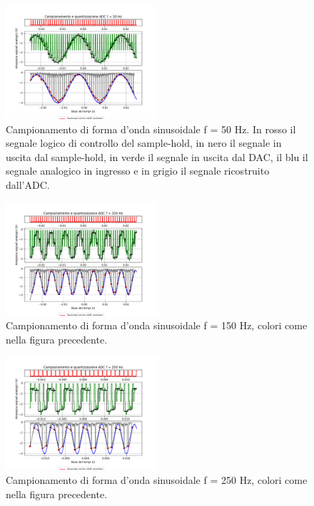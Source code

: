 \documentclass[journal]{IEEEtran}
\begin{document}
\clearpage
\clearpage
\begin{figure}[H]%
\begin{center}
\includegraphics[trim={0 25 0 0}, clip, width=0.50\textwidth]{analysis/output/campionamento_50Hz.pdf}

\caption{Campionamento di forma d'onda sinusoidale f = 50 Hz. In rosso il segnale logico di controllo del sample-hold, in nero il segnale in uscita dal sample-hold, in verde il segnale in uscita dal DAC, il blu il segnale analogico in ingresso e in grigio il segnale ricostruito dall'ADC.}
\label{fig:sampSH1}
\end{center}
\end{figure}
\vspace{-10mm}
%
\begin{figure}[H]%
\begin{center}
\includegraphics[trim={0 25 0 0}, clip,width=0.50\textwidth]{analysis/output/campionamento_150Hz.pdf}
\caption{Campionamento di forma d'onda sinusoidale f = 150 Hz, colori come nella figura precedente.}
\label{fig:sampSH2}
\end{center}
\end{figure}
\vspace{-10mm}
%
\begin{figure}[H]%
\begin{center}
\includegraphics[trim={0 25 0 0}, clip,width=0.50\textwidth]{analysis/output/campionamento_250Hz.pdf}
\caption{Campionamento di forma d'onda sinusoidale f = 250 Hz, colori come nella figura precedente.}
\label{fig:sampSH3}
\end{center}
\end{figure}
\end{document}
